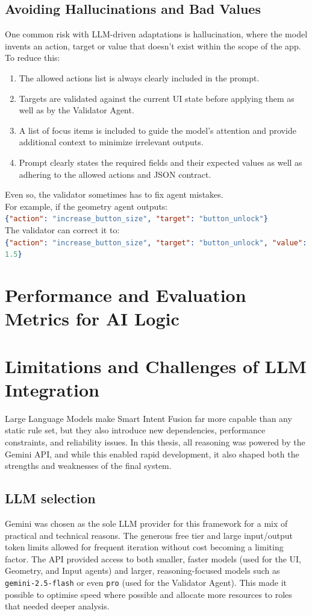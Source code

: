\documentclass[openany]{book}
\begin{document}
\subsection{Avoiding Hallucinations and Bad Values}
One common risk with LLM-driven adaptations is hallucination, where the model invents an action, target or value that doesn’t exist within the scope of the app.
To reduce this:
\begin{enumerate}
    \item The allowed actions list is always clearly included in the prompt.
    \item Targets are validated against the current UI state before applying them as well as by the Validator Agent.
    \item A list of focus items is included to guide the model's attention and provide additional context to minimize irrelevant outputs.
    \item Prompt clearly states the required fields and their expected values as well as adhering to the allowed actions and JSON contract.
\end{enumerate}
Even so, the validator sometimes has to fix agent mistakes.\\
For example, if the geometry agent outputs: \\
\lstinline[language=json]|{"action": "increase_button_size", "target": "button_unlock"}|\\
The validator can correct it to:\\
\lstinline[language=json]|{"action": "increase_button_size", "target": "button_unlock", "value": 1.5}|

\section{Performance and Evaluation Metrics for AI Logic}

\section{Limitations and Challenges of LLM Integration}
Large Language Models make Smart Intent Fusion far more capable than any static rule set, but they also introduce new dependencies, performance constraints, and reliability issues. In this thesis, all reasoning was powered by the Gemini API, and while this enabled rapid development, it also shaped both the strengths and weaknesses of the final system.

\subsection{LLM selection}
Gemini was chosen as the sole LLM provider for this framework for a mix of practical and technical reasons. The generous free tier and large input/output token limits allowed for frequent iteration without cost becoming a limiting factor. The API provided access to both smaller, faster models (used for the UI, Geometry, and Input agents) and larger, reasoning-focused models such as \texttt{gemini-2.5-flash} or even \texttt{pro} (used for the Validator Agent). This made it possible to optimise speed where possible and allocate more resources to roles that needed deeper analysis.
\end{document}
